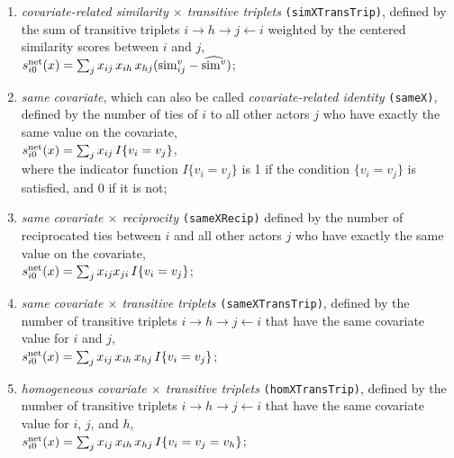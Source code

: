 \documentclass[a4paper,fleqn,11pt]{article}
\newcommand{\+}{\, + \,}
\newcommand{\vit}{\theenumi}
\begin{document}
\begin{enumerate}
 \item {\em covariate-related similarity $\times$ transitive triplets}
 \texttt{(simXTransTrip)}, defined by the sum of transitive triplets
 $i \rightarrow h \rightarrow j \leftarrow i$
 weighted by the centered similarity scores between $i$ and $j$,\\
 $s^{\rm net}_{i\vit}(x) = \sum_j x_{ij}\, x_{ih} \, x_{hj}
         ({\rm sim}^v_{ij} - \widehat{{\rm sim}^v}) $;

 \item \emph{same covariate}, which can also be called {\em covariate-related identity} \texttt{(sameX)},
 defined by the
 number of ties of $i$ to all other actors $j$ who have
 exactly the same value on the covariate,\\
 $s^{\rm net}_{i\vit}(x) = \sum_j x_{ij}\, I\{v_i = v_j \} $,\\
 where the indicator function $I\{v_i = v_j \} $ is 1 if the condition $\{v_i = v_j \} $
 is satisfied, and 0 if it is not;

 \item {\em same covariate $\times$ reciprocity}
\texttt{(sameXRecip)} defined by the
 number of reciprocated ties between $i$ and all other actors $j$ who have
 exactly the same value on the covariate,\\
 $s^{\rm net}_{i\vit}(x) = \sum_j x_{ij} x_{ji}\, I\{v_i = v_j \} $;

 \item {\em same covariate $\times$ transitive triplets}
 \texttt{(sameXTransTrip)}, defined by the number of transitive triplets
 $i \rightarrow h \rightarrow j \leftarrow i$
 that have the same covariate value for $i$ and $j$,\\
 $s^{\rm net}_{i\vit}(x) =
 \sum_j x_{ij}\, x_{ih} \, x_{hj} \, I\{v_i = v_j\}$;

 \item {\em homogeneous covariate $\times$ transitive triplets}
 \texttt{(homXTransTrip)}, defined by the number of transitive triplets
 $i \rightarrow h \rightarrow j \leftarrow i$
 that have the same covariate value for $i$, $j$, and $h$,\\
 $s^{\rm net}_{i\vit}(x) =
 \sum_j x_{ij}\, x_{ih} \, x_{hj} \, I\{v_i = v_j = v_h\}$;


\end{enumerate}
\end{document}
